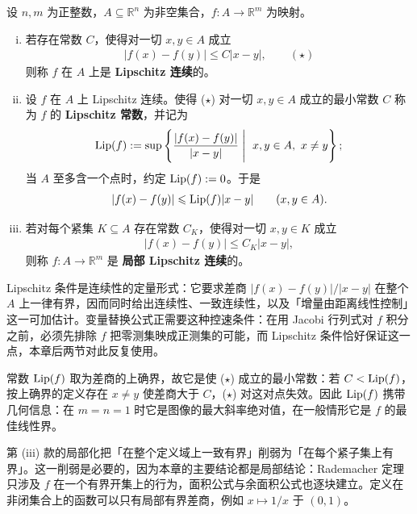 \documentclass[../../main.tex]{subfiles}%
\begin{document}
\begin{definition}[Lipschitz 连续]\label{definition:ch03-3-1}
设 $n,m$ 为正整数，$A\subseteq\mathbb{R}^n$ 为非空集合，$f:A\to\mathbb{R}^m$ 为映射。
\begin{enumerate}[(i)]
\item 若存在常数 $C$，使得对一切 $x,y\in A$ 成立
\begin{align*}
\lvert f(x)-f(y)\rvert\leqslant C\lvert x-y\rvert,\qquad(\star)
\end{align*}
则称 $f$ 在 $A$ 上是 \textbf{Lipschitz 连续}的。
\item 设 $f$ 在 $A$ 上 Lipschitz 连续。使得 ($\star$) 对一切 $x,y\in A$ 成立的最小常数 $C$ 称为 $f$ 的 \textbf{Lipschitz 常数}，并记为
\begin{align*}
\operatorname{Lip}(f):=\sup\left\{\frac{\lvert f(x)-f(y)\rvert}{\lvert x-y\rvert}\Biggm|\ x,y\in A,\ x\neq y\right\};
\end{align*}
当 $A$ 至多含一个点时，约定 $\operatorname{Lip}(f):=0$。于是
\begin{align*}
\lvert f(x)-f(y)\rvert\leqslant\operatorname{Lip}(f)\lvert x-y\rvert\qquad(x,y\in A).
\end{align*}
\item 若对每个紧集 $K\subseteq A$ 存在常数 $C_K$，使得对一切 $x,y\in K$ 成立
\begin{align*}
\lvert f(x)-f(y)\rvert\leqslant C_K\lvert x-y\rvert,
\end{align*}
则称 $f:A\to\mathbb{R}^m$ 是 \textbf{局部 Lipschitz 连续}的。
\end{enumerate}
\end{definition}

\begin{remark}\label{remark:ch03-def-3-1-动机}
Lipschitz 条件是连续性的定量形式：它要求差商 $\lvert f(x)-f(y)\rvert/\lvert x-y\rvert$ 在整个 $A$ 上一律有界，因而同时给出连续性、一致连续性，以及「增量由距离线性控制」这一可加估计。变量替换公式正需要这种控速条件：在用 Jacobi 行列式对 $f$ 积分之前，必须先排除 $f$ 把零测集映成正测集的可能，而 Lipschitz 条件恰好保证这一点，本章后两节对此反复使用。

常数 $\operatorname{Lip}(f)$ 取为差商的上确界，故它是使 ($\star$) 成立的最小常数：若 $C<\operatorname{Lip}(f)$，按上确界的定义存在 $x\neq y$ 使差商大于 $C$，($\star$) 对这对点失效。因此 $\operatorname{Lip}(f)$ 携带几何信息：在 $m=n=1$ 时它是图像的最大斜率绝对值，在一般情形它是 $f$ 的最佳线性界。

第 (iii) 款的局部化把「在整个定义域上一致有界」削弱为「在每个紧子集上有界」。这一削弱是必要的，因为本章的主要结论都是局部结论：Rademacher 定理只涉及 $f$ 在一个有界开集上的行为，面积公式与余面积公式也逐块建立。定义在非闭集合上的函数可以只有局部有界差商，例如 $x\mapsto 1/x$ 于 $(0,1)$。
\end{remark}
\end{document}
